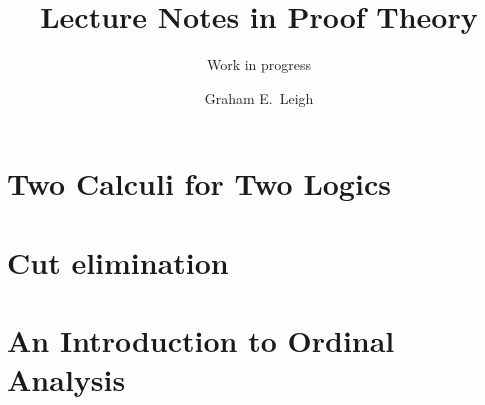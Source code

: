 \documentclass[%
	paper=174mm:247mm,
	DIV=10,
	leqno,
	titlepage,
	headsepline,
	headsepline=false,
	dynindent,
	dynnumwidth,
	toc=bib,
	toc=sectionentrywithoutdots,
	toc=chapterentrywithoutdots,
	unicode
	]%
	{scrbook}
\title{Lecture Notes in Proof Theory}
\subtitle{Work in progress}
\author{Graham E.\ Leigh}
\begin{document}
\frontmatter
\maketitle



\tableofcontents

\mainmatter


%
\part{Two Calculi for Two Logics}
%



%
\part{Cut elimination}
%




%
\part{An Introduction to Ordinal Analysis}
%




%

\backmatter



\end{document}
